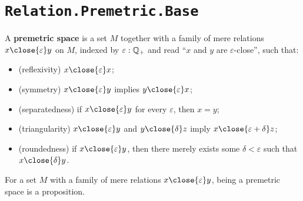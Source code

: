 \section{\texttt{Relation.Premetric.Base}}

\begin{definition}
  \label{IsPremetric}
  A \textbf{premetric space} is a set $M$ together with a family of mere relations $x \close{\varepsilon} y$ on $M$, indexed by $\varepsilon : \mathbb{Q}_{+}$ and read ``$x$ and $y$ are $\varepsilon$-close'', such that:
  \begin{itemize}
  \item (reflexivity) $x \close{\varepsilon} x$;
  \item (symmetry) $x \close{\varepsilon} y$ implies $y \close{\varepsilon} x$;
  \item (separatedness) if $x \close{\varepsilon} y$ for every $\varepsilon$, then $x = y$;
  \item (triangularity) $x \close{\varepsilon} y$ and $y \close{\delta} z$ imply $x \close{\varepsilon + \delta} z$;
  \item (roundedness) if $x \close{\varepsilon} y$, then there merely exists some $\delta < \varepsilon$ such that $x \close{\delta} y$.
  \end{itemize}
\end{definition}

\begin{lemma}
  \label{isPropIsPremetric}
  For a set $M$ with a family of mere relations $x \close{\varepsilon} y$, being a premetric space is a proposition.
\end{lemma}
